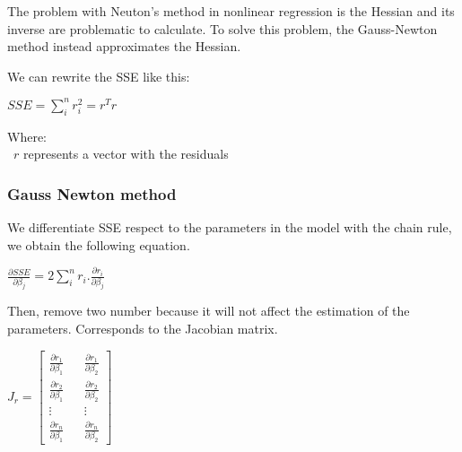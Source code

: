 \documentclass[conference]{IEEEtran}
\begin{document}
The problem with Neuton's method in nonlinear regression is the Hessian and its inverse are problematic to calculate. To solve this problem, the Gauss-Newton method instead approximates the Hessian.

We can rewrite the SSE like this:
\begin{center}
    $SSE = \sum_{i}^{n}r_i^2 = r^Tr$
\end{center}

Where: \\
\indent\textbullet\ \(r\) represents a vector with the residuals \\

\subsubsection{Gauss Newton method}
We differentiate SSE respect to the parameters in the model with the chain rule, we obtain the following equation.
\begin{center}

    \(
    {\frac{\partial SSE}{\partial \beta_j}} = 2\sum_{i}^{n}{r_i.\frac{\partial r_i}{\partial\beta_j}}
    \)

\end{center}
Then, remove two number because it will not affect the estimation of the parameters. Corresponds to the Jacobian matrix.


\begin{center}

    \(
    J_r = \begin{bmatrix}
        \frac{\partial r_1}{\partial \beta_1} &  & \frac{\partial r_1}{\partial \beta_2} \\
        \frac{\partial r_2}{\partial \beta_1} &  & \frac{\partial r_2}{\partial \beta_2} \\
        \vdots                                &  & \vdots                                \\
        \frac{\partial r_n}{\partial \beta_1} &  & \frac{\partial r_n}{\partial \beta_2}
    \end{bmatrix}
    \)

\end{center}
\end{document}
